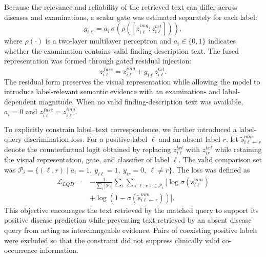 \documentclass[Afour,sagev,times]{sagej}
\begin{document}
Because the relevance and reliability of the retrieved text can differ across diseases and examinations, a scalar gate was estimated separately for each label:
\begin{equation}
g_{i\ell}=a_i\,\sigma\!\left(\rho([z_{i\ell}^{img};z_{i\ell}^{txt}])\right),
\end{equation}
where $\rho(\cdot)$ is a two-layer multilayer perceptron and $a_i\in\{0,1\}$ indicates whether the examination contains valid finding-description text. The fused representation was formed through gated residual injection:
\begin{equation}
z_{i\ell}^{fuse}=z_{i\ell}^{img}+g_{i\ell}z_{i\ell}^{txt}.
\end{equation}
The residual form preserves the visual representation while allowing the model to introduce label-relevant semantic evidence with an examination- and label-dependent magnitude. When no valid finding-description text was available, $a_i=0$ and $z_{i\ell}^{fuse}=z_{i\ell}^{img}$.

To explicitly constrain label--text correspondence, we further introduced a label-query discrimination loss. For a positive label $\ell$ and an absent label $r$, let $\widetilde{s}_{i\ell\leftarrow r}^{mm}$ denote the counterfactual logit obtained by replacing $z_{i\ell}^{txt}$ with $z_{ir}^{txt}$ while retaining the visual representation, gate, and classifier of label $\ell$. The valid comparison set was $\mathcal{P}_i=\{(\ell,r)\mid a_i=1,\ y_{i\ell}=1,\ y_{ir}=0,\ \ell\neq r\}$. The loss was defined as
\begin{equation}
\begin{aligned}
\mathcal{L}_{LQD}={}&-\frac{1}{\sum_i|\mathcal{P}_i|}
\sum_i\sum_{(\ell,r)\in\mathcal{P}_i}\Big[
\log\sigma(s_{i\ell}^{mm})\\
&+\log\left(1-\sigma(\widetilde{s}_{i\ell\leftarrow r}^{mm})\right)\Big].
\end{aligned}
\end{equation}
This objective encourages the text retrieved by the matched query to support its positive disease prediction while preventing text retrieved by an absent disease query from acting as interchangeable evidence. Pairs of coexisting positive labels were excluded so that the constraint did not suppress clinically valid co-occurrence information.
\end{document}
